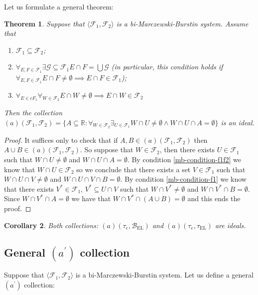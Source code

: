 \documentclass[12pt]{amsart}
\theoremstyle{plain}
\newtheorem{theorem}{Theorem}[section]
\newtheorem{corollary}[theorem]{Corollary}
\theoremstyle{definition}
\theoremstyle{remark}
\newcommand{\real}{\mathbb{R}}
\newcommand{\cB}{{\mathcal B}}
\newcommand{\cF}{{\mathcal F}}
\newcommand{\cG}{{\mathcal G}}
\newcommand{\aideal}{\mathit{(a)}}
\newcommand{\aidealprime}{\mathit{(a^\prime)}}
\newcommand{\biMB}{bi-Marczewski-Burstin}
\newcommand{\tauEllentuck}{\tau_{\mathrm{EL}}}
\newcommand{\baseEllentuck}{\cB_{\mathrm{EL}}}
\begin{document}
Let us formulate a general theorem:

\begin{theorem}
Suppose that $\langle \cF_1, \cF_2 \rangle$ is a \biMB{} system.
Assume that 
\begin{enumerate}	
\item
\label{mb-condition-subset}
  $\cF_1 \subseteq \cF_2$;
\item 
\label{mb-condition-f1}
 $\forall_{E,F \in \cF_1} \exists{\cG \subseteq \cF_1} E \cap F 
 = \bigcup \cG$
 (in particular, 
 this condition holds if $\forall_{E,F \in \cF_1} E \cap F \not= \emptyset \implies E \cap F \in \cF_1$);  
\item
\label{mb-condition-f1f2}
  $\forall_{E \in cF_1} \forall_{W \in \cF_2} E \cap W \not= \emptyset \implies E \cap W \in \cF_2$  
\end{enumerate}	
Then the collection
$\aideal(\cF_1, \cF_2) = \lbrace A \subseteq \real\colon 
\forall_{W\in \cF_2} \exists_{U \in \cF_1}
W \cap U \not= \emptyset \wedge W \cap U \cap A = \emptyset
\rbrace$ 
is an ideal. 
\end{theorem}
\begin{proof}
It suffices only to check that if $A, B \in \aideal(\cF_1, \cF_2)$ then
$A\cup B \in \aideal(\cF_1, \cF_2)$.
So suppose that $W \in \cF_2$, then there exists $U\in\cF_1$
such that 
$W \cap U \not= \emptyset$ and $W \cap U \cap A = \emptyset$.
By condition \ref{mb-condition-f1f2} 
we know that $W \cap U \in \cF_2$ so
we conclude that
there exists a set $V \in \cF_1$ such that
$W \cap U \cap V \not= \emptyset$ and $W \cap U \cap V \cap B = \emptyset$.
By condition \ref{mb-condition-f1} we know that 
there exists $V^* \in \cF_1$, $V^* \subseteq U \cap V$ such that 
$W \cap V^* \not= \emptyset$ and $W \cap V^* \cap B = \emptyset$.
Since $W \cap V^* \cap A = \emptyset$ we have that 
$W \cap V^* \cap (A \cup B) = \emptyset$
and this ends the proof.
\end{proof}

\begin{corollary}
Both collections: $\aideal(\tau_e, \baseEllentuck)$ and
$\aideal(\tau_e, \tauEllentuck)$ are ideals.
\end{corollary} 

\subsection{General $\aidealprime$ collection}

Suppose that $\langle \cF_1, \cF_2 \rangle$ is a \biMB{} system.
Let us define a general $\aidealprime$ collection:
\end{document}
